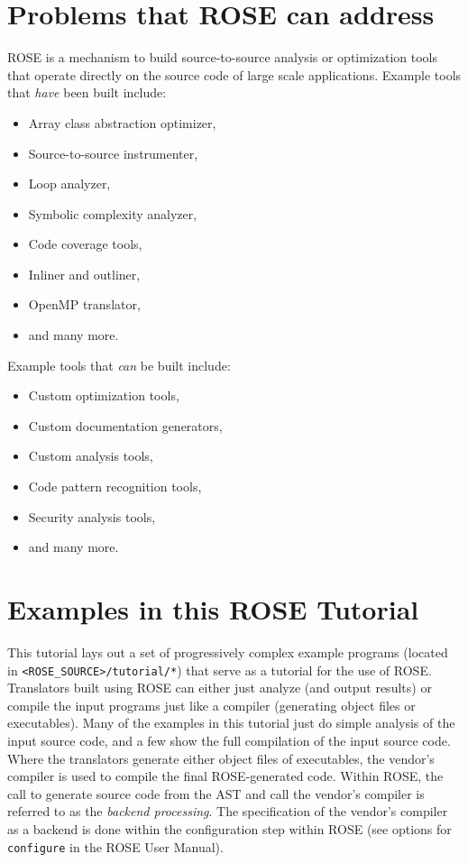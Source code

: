 \section{Problems that ROSE can address}
    ROSE is a mechanism to build source-to-source analysis or 
optimization tools that operate directly on the source code of large 
scale applications.  Example tools that {\em have} been built include:
\begin{itemize}
   \item Array class abstraction optimizer,
   \item Source-to-source instrumenter,
   \item Loop analyzer,
   \item Symbolic complexity analyzer,
   \item Code coverage tools,
   \item Inliner and outliner,
   \item OpenMP translator,
   \item and many more.
\end{itemize}
Example tools that {\em can} be built include:
\begin{itemize}
   \item Custom optimization tools,
   \item Custom documentation generators,
   \item Custom analysis tools,
   \item Code pattern recognition tools,
   \item Security analysis tools,
   \item and many more.
\end{itemize}



\section{Examples in this ROSE Tutorial}

    This tutorial lays out a set of progressively
complex example programs (located in 
{\tt <ROSE\_SOURCE>/tutorial/*}) that serve as a tutorial for the use of ROSE.
Translators built using ROSE can either just analyze (and output results)
or compile the input programs just like a compiler (generating object files 
or executables).  Many of the examples in this tutorial just do simple analysis
of the input source code, and a few show the full compilation of the input source code.
Where the translators generate either object files of executables, the 
vendor's compiler is used to compile the final ROSE-generated code.  Within
ROSE, the call to generate source code from the AST and call the vendor's compiler
is referred to as the {\em backend processing}.  The specification of the vendor's compiler
as a backend is done within the configuration step within ROSE (see options for 
{\tt configure} in the ROSE User Manual).

